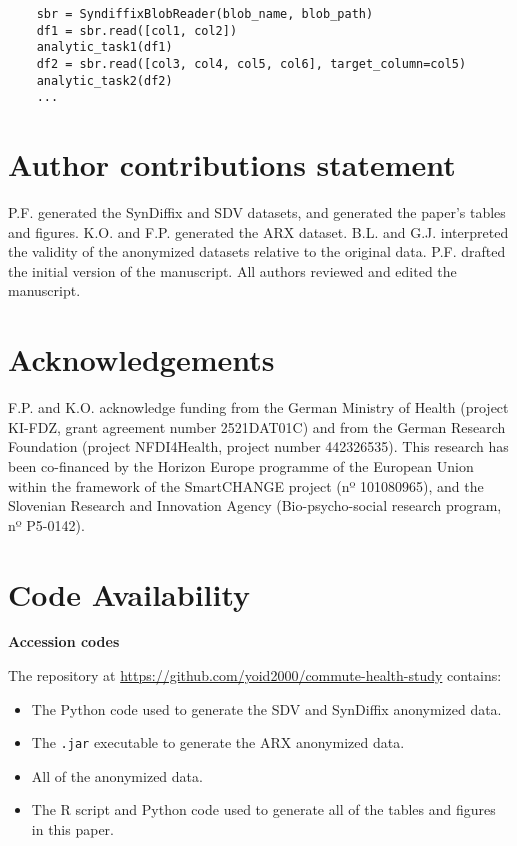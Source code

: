 \documentclass[10pt]{article}
\begin{document}
{\small
\begin{verbatim}
    sbr = SyndiffixBlobReader(blob_name, blob_path)
    df1 = sbr.read([col1, col2])
    analytic_task1(df1)
    df2 = sbr.read([col3, col4, col5, col6], target_column=col5)
    analytic_task2(df2)
    ...
\end{verbatim}
}

\section*{Author contributions statement}

P.F. generated the SynDiffix and SDV datasets, and generated the paper's tables and figures. K.O. and F.P. generated the ARX dataset. B.L. and G.J. interpreted the validity of the anonymized datasets relative to the original data. P.F. drafted the initial version of the manuscript. All authors reviewed and edited the manuscript.

\section*{Acknowledgements}

F.P. and K.O. acknowledge funding from the German Ministry of Health (project KI-FDZ, grant agreement number 2521DAT01C) and from the German Research Foundation (project NFDI4Health, project number 442326535). This research has been co-financed by  the Horizon Europe programme of the European Union within the framework of the SmartCHANGE project (nº 101080965), and the Slovenian Research and Innovation Agency (Bio-psycho-social research program, nº P5-0142).

\section*{Code Availability}

\noindent \textbf{Accession codes}

The repository at {\small \url{https://github.com/yoid2000/commute-health-study}} contains:
\begin{itemize}
    \item The Python code used to generate the SDV and SynDiffix anonymized data. 
    \item The \texttt{.jar} executable to generate the ARX anonymized data.
    \item All of the anonymized data.
    \item The R script and Python code used to generate all of the tables and figures in this paper.
\end{itemize}
\end{document}
